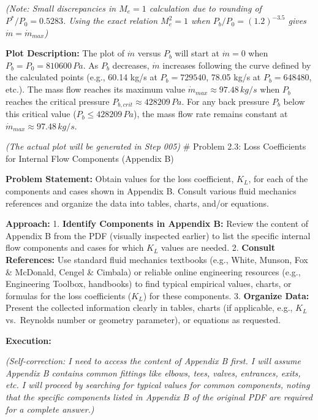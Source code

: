 \emph{(Note: Small discrepancies in \(M_e=1\) calculation due to
rounding of \(P^*/P_0=0.5283\). Using the exact relation \(M_e^2=1\)
when \(P_b/P_0 = (1.2)^{-3.5}\) gives \(\dot{m}=\dot{m}_{max}\))}

\textbf{Plot Description:} The plot of \(\dot{m}\) versus \(P_b\) will
start at \(\dot{m}=0\) when \(P_b = P_0 = 810600 \, Pa\). As \(P_b\)
decreases, \(\dot{m}\) increases following the curve defined by the
calculated points (e.g., 60.14 kg/s at \(P_b=729540\), 78.05 kg/s at
\(P_b=648480\), etc.). The mass flow reaches its maximum value
\(\dot{m}_{max} \approx 97.48 \, kg/s\) when \(P_b\) reaches the
critical pressure \(P_{b, crit} \approx 428209 \, Pa\). For any back
pressure \(P_b\) below this critical value (\(P_b \le 428209 \, Pa\)),
the mass flow rate remains constant at
\(\dot{m}_{max} \approx 97.48 \, kg/s\).

\emph{(The actual plot will be generated in Step 005)} \# Problem 2.3:
Loss Coefficients for Internal Flow Components (Appendix B)

\textbf{Problem Statement:} Obtain values for the loss coefficient,
\(K_L\), for each of the components and cases shown in Appendix B.
Consult various fluid mechanics references and organize the data into
tables, charts, and/or equations.

\textbf{Approach:} 1. \textbf{Identify Components in Appendix B:} Review
the content of Appendix B from the PDF (visually inspected earlier) to
list the specific internal flow components and cases for which \(K_L\)
values are needed. 2. \textbf{Consult References:} Use standard fluid
mechanics textbooks (e.g., White, Munson, Fox \& McDonald, Cengel \&
Cimbala) or reliable online engineering resources (e.g., Engineering
Toolbox, handbooks) to find typical empirical values, charts, or
formulas for the loss coefficients (\(K_L\)) for these components. 3.
\textbf{Organize Data:} Present the collected information clearly in
tables, charts (if applicable, e.g., \(K_L\) vs.~Reynolds number or
geometry parameter), or equations as requested.

\textbf{Execution:}

\emph{(Self-correction: I need to access the content of Appendix B
first. I will assume Appendix B contains common fittings like elbows,
tees, valves, entrances, exits, etc. I will proceed by searching for
typical values for common components, noting that the specific
components listed in Appendix B of the original PDF are required for a
complete answer.)}

